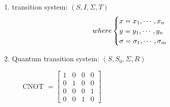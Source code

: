 \documentclass[aspectratio=1610,18pt]{ctexbeamer}
\begin{document}
\begin{frame}
  \begin{enumerate}
    \Large
    \item  transition system: $(S, I, \Sigma, T)$
    \begin{equation}
      where
      \begin{cases}
        x = x_1, \cdots, x_n\\
        y = y_1, \cdots, y_n\\
        \sigma = \sigma_1, \cdots, \sigma_m
      \end{cases}
      \notag
    \end{equation}
    \item Quantum transition system: $(S, S_0, \Sigma, R)$
  \end{enumerate}
\end{frame}
\begin{frame}
  \begin{figure}
    \centering
    \begin{minipage}[t]{0.48\textwidth}
    \centering
    \end{minipage}
    \begin{minipage}[t]{0.48\textwidth}
    \centering
    $\text { CNOT }=\left[\begin{array}{llll}
      1 & 0 & 0 & 0 \\
      0 & 1 & 0 & 0 \\
      0 & 0 & 0 & 1 \\
      0 & 0 & 1 & 0
      \end{array}\right]$
    \end{minipage}
  \end{figure}
\end{frame}
\end{document}
